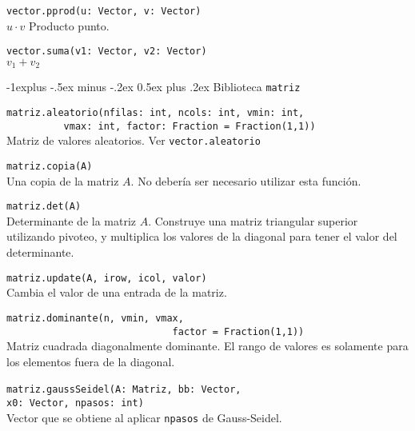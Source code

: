 \documentclass[10pt,landscape]{article}
\makeatletter
\renewcommand{\subsection}{\@startsection{subsection}{2}{0mm}%
                                {-1explus -.5ex minus -.2ex}%
                                {0.5ex plus .2ex}%
                                {\normalfont\normalsize\bfseries}}
\makeatother
\begin{document}
\begin{multicols}{3}
\begin{asparaitem}
\item \verb|vector.pprod(u: Vector, v: Vector)| \\
\quad $u\cdot v$ Producto punto.

\item \verb|vector.suma(v1: Vector, v2: Vector)| \\
\quad $v_1 + v_2$
\end{asparaitem}

\subsection{Biblioteca \texttt{matriz}}

\begin{asparaitem}
\item \verb|matriz.aleatorio(nfilas: int, ncols: int, vmin: int,| \\
  \verb|          vmax: int, factor: Fraction = Fraction(1,1))| \\
  \quad Matriz de valores aleatorios. Ver \verb|vector.aleatorio|

\item \verb|matriz.copia(A)| \\
  \quad Una copia de la matriz $A$. No deber\'ia ser necesario utilizar esta funci\'on.

\item \verb|matriz.det(A)| \\
  \quad Determinante de la matriz $A$. Construye una matriz triangular superior utilizando pivoteo, y multiplica los valores de la diagonal para tener el valor del determinante.

\item \verb|matriz.update(A, irow, icol, valor)| \\
  \quad Cambia el valor de una entrada de la matriz.

\item \verb|matriz.dominante(n, vmin, vmax,| \\
  \verb|                             factor = Fraction(1,1))| \\
    \quad Matriz cuadrada diagonalmente dominante. El rango de valores es solamente para los elementos fuera de la diagonal.

\item \verb|matriz.gaussSeidel(A: Matriz, bb: Vector,|
  \verb|                            x0: Vector, npasos: int)|\\
  \quad Vector que se obtiene al aplicar \verb|npasos| de Gauss-Seidel.


\end{asparaitem}
\end{multicols}
\end{document}

